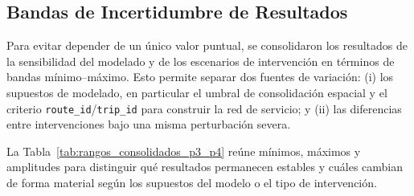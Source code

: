         \subsection{Bandas de Incertidumbre de Resultados}
            Para evitar depender de un único valor puntual, se consolidaron los resultados de la sensibilidad del modelado y de los escenarios de intervención en términos de bandas mínimo--máximo. Esto permite separar dos fuentes de variación: (i) los supuestos de modelado, en particular el umbral de consolidación espacial y el criterio \texttt{route\_id}/\texttt{trip\_id} para construir la red de servicio; y (ii) las diferencias entre intervenciones bajo una misma perturbación severa.

            La Tabla~\ref{tab:rangos_consolidados_p3_p4} reúne mínimos, máximos y amplitudes para distinguir qué resultados permanecen estables y cuáles cambian de forma material según los supuestos del modelo o el tipo de intervención.

            \begin{table}[h!]
                \centering
                \small
                \caption{Rangos mínimo--máximo de indicadores clave de sensibilidad del modelado y de escenarios de intervención sobre la red modelada. La síntesis permite distinguir qué resultados permanecen estables y cuáles dependen de los supuestos adoptados.}
                \label{tab:rangos_consolidados_p3_p4}
            \end{table}

